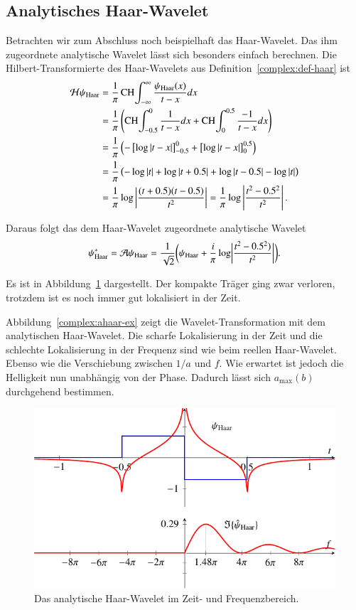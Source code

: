 \subsection{Analytisches Haar-Wavelet}
Betrachten wir zum Abschluss noch beispielhaft das Haar-Wavelet.
Das ihm zugeordnete analytische Wavelet lässt sich besonders einfach berechnen.
Die Hilbert-Transformierte des Haar-Wavelets aus Definition~\ref{complex:def-haar} ist
\begin{align*}
	\Hilb \psi_{\text{Haar}}
	&= \frac{1}{\pi} \CH\int_{-\infty}^{\infty} \frac{\psi_{\text{Haar}}(x)}{t-x} dx\\
	&= \frac{1}{\pi}\left( \CH\int_{-0.5}^{0} \frac{1}{t-x}dx + \CH\int_{0}^{0.5} \frac{-1}{t-x}dx \right)\\
	&= \frac{1}{\pi} \left( -\left[\log \left|t-x\right| \right]_{-0.5}^{0} + \left[\log\left|t-x\right| \right]_{0}^{0.5} \right)\\
	&= \frac{1}{\pi} \left( -\log\left|t\right| + \log\left|t+0.5\right| + \log\left|t-0.5\right| - \log\left|t\right|\right)\\
	&= \frac{1}{\pi} \log\left|\frac{(t+0.5)(t-0.5)}{t^2}\right|
= \frac{1}{\pi} \log\left|\frac{t^2-0.5^2}{t^2}\right|.
\end{align*}

Daraus folgt das dem Haar-Wavelet zugeordnete analytische Wavelet
\[\psi^\ast_{\text{Haar}} = \Ana \psi_{\text{Haar}} =
\frac{1}{\sqrt{2}}\biggl(\psi_{\text{Haar}} 
+ 
\frac{i}{\pi} \log\biggl|\frac{t^2-0.5^2)}{t^2}\biggr|\biggr).\]

Es ist in Abbildung~\ref{complex:ahaar} dargestellt.
Der kompakte Träger ging zwar verloren, trotzdem ist es noch immer gut lokalisiert in der Zeit.

Abbildung~\ref{complex:ahaar-ex} zeigt die Wavelet-Transformation mit dem analytischen Haar-Wavelet.
Die scharfe Lokalisierung in der Zeit und die schlechte Lokalisierung in der Frequenz sind wie beim reellen Haar-Wavelet. Ebenso wie die Verschiebung zwischen $1/a$ und $f$.
Wie erwartet ist jedoch die Helligkeit nun unabhängig von der Phase.
Dadurch lässt sich $a_\text{max}(b)$ durchgehend bestimmen.

\begin{figure}
	\centering
	\includegraphics{papers/complex/images/ahaar.pdf}
	\caption{Das analytische Haar-Wavelet im Zeit- und Frequenzbereich.}
	\label{complex:ahaar}
\end{figure}

